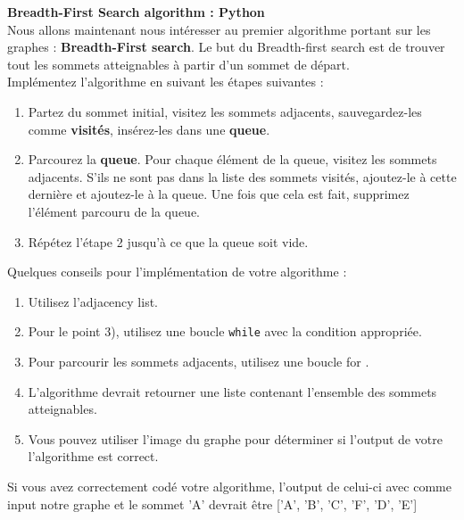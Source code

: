 \begin{Exercice}[15 minutes]  \textbf{Breadth-First Search algorithm : Python}\\
    Nous allons maintenant nous intéresser au premier algorithme portant sur les graphes : \textbf{Breadth-First search}. Le but du Breadth-first search est de trouver tout les sommets atteignables à partir d'un sommet de départ.\\
    Implémentez l'algorithme en suivant les étapes suivantes :\\
    \begin{enumerate}
    
    \item Partez du sommet initial, visitez les sommets adjacents, sauvegardez-les comme \textbf{visités}, insérez-les dans une \textbf{queue}.
    
    \item Parcourez la \textbf{queue}. Pour chaque élément de la queue, visitez les sommets adjacents. S'ils ne sont pas dans la liste des sommets visités, ajoutez-le à cette dernière et ajoutez-le à la queue. Une fois que cela est fait, supprimez l'élément parcouru de la queue.
    
    \item Répétez l'étape 2 jusqu'à ce que la queue soit vide.\\

    \end{enumerate}

    \begin{conseil}
        Quelques conseils pour l'implémentation de votre algorithme :
        \begin{enumerate}
            \item Utilisez l'adjacency list.
            \item Pour le point 3), utilisez une boucle \lstinline{while} avec la condition appropriée.
            \item Pour parcourir les sommets adjacents, utilisez une boucle for .
            \item L'algorithme devrait retourner une liste contenant l'ensemble des sommets atteignables.
            \item Vous pouvez utiliser l'image du graphe pour déterminer si l'output de votre l'algorithme est correct.
        \end{enumerate}
    \end{conseil}
    \begin{solution}
        
        Si vous avez correctement codé votre algorithme, l'output de celui-ci avec comme input notre graphe et le sommet 'A' devrait être ['A', 'B', 'C', 'F', 'D', 'E']
    \end{solution}
\end{Exercice}

